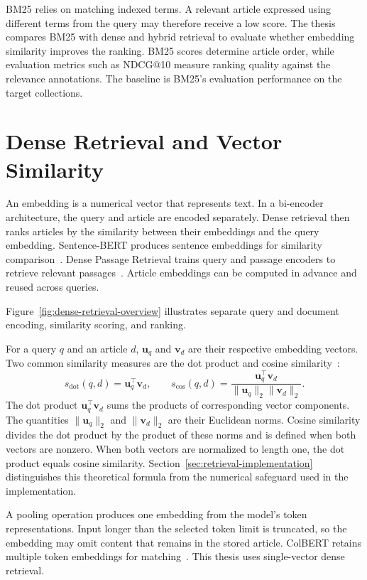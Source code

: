 BM25 relies on matching indexed terms. A relevant article expressed using different terms from the query may therefore receive a low score. The thesis compares BM25 with dense and hybrid retrieval to evaluate whether embedding similarity improves the ranking. BM25 scores determine article order, while evaluation metrics such as NDCG@10 measure ranking quality against the relevance annotations. The baseline is BM25's evaluation performance on the target collections.

\section{Dense Retrieval and Vector Similarity}
\label{sec:dense-similarity}

An embedding is a numerical vector that represents text. In a bi-encoder architecture, the query and article are encoded separately. Dense retrieval then ranks articles by the similarity between their embeddings and the query embedding. Sentence-BERT produces sentence embeddings for similarity comparison~\cite{reimers2019}. Dense Passage Retrieval trains query and passage encoders to retrieve relevant passages~\cite{karpukhin2020}. Article embeddings can be computed in advance and reused across queries.

Figure~\ref{fig:dense-retrieval-overview} illustrates separate query and document encoding, similarity scoring, and ranking.



For a query \(q\) and an article \(d\), \(\mathbf{u}_q\) and \(\mathbf{v}_d\) are their respective embedding vectors. Two common similarity measures are the dot product and cosine similarity~\cite{manning2008}:
\[
s_{\mathrm{dot}}(q,d)=\mathbf{u}_q^\top\mathbf{v}_d,
\qquad
s_{\mathrm{cos}}(q,d)=\frac{\mathbf{u}_q^\top\mathbf{v}_d}{\lVert\mathbf{u}_q\rVert_2\lVert\mathbf{v}_d\rVert_2}.
\]
The dot product \(\mathbf{u}_q^\top\mathbf{v}_d\) sums the products of corresponding vector components. The quantities \(\lVert\mathbf{u}_q\rVert_2\) and \(\lVert\mathbf{v}_d\rVert_2\) are their Euclidean norms. Cosine similarity divides the dot product by the product of these norms and is defined when both vectors are nonzero. When both vectors are normalized to length one, the dot product equals cosine similarity. Section~\ref{sec:retrieval-implementation} distinguishes this theoretical formula from the numerical safeguard used in the implementation.

A pooling operation produces one embedding from the model's token representations. Input longer than the selected token limit is truncated, so the embedding may omit content that remains in the stored article. ColBERT retains multiple token embeddings for matching~\cite{khattab2020}. This thesis uses single-vector dense retrieval.

